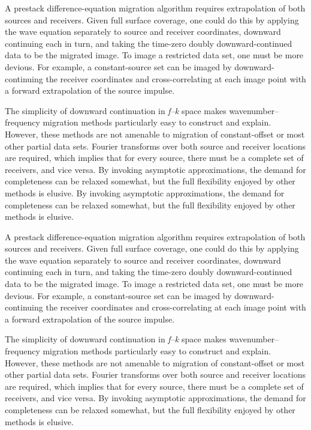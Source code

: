 \begin{examples}
A prestack difference-equation migration algorithm requires extrapolation of both sources and receivers. Given full surface coverage, one could
do this by applying the wave equation separately to source and receiver coordinates, downward continuing each in turn, and taking the time-zero doubly
downward-continued data to be the migrated image. To image a restricted data set, one must be more devious. For example, a constant-source
set can be imaged by downward-continuing the receiver coordinates and cross-correlating at each image point with a forward extrapolation of the source
impulse.
\end{examples}

The simplicity of downward continuation in \textit{f--k} space makes wavenumber--frequency migration methods particularly easy to construct and explain.
However, these methods are not amenable to migration of constant-offset or most other partial data sets. Fourier transforms over both source
and receiver locations are required, which implies that for every source, there must be a complete set of receivers, and vice versa. By invoking
asymptotic approximations, the demand for completeness can be relaxed somewhat, but the full flexibility enjoyed by other methods is elusive. By invoking
asymptotic approximations, the demand for completeness can be relaxed somewhat, but the full flexibility enjoyed by other methods is elusive.

\begin{problems}
A prestack difference-equation migration algorithm requires extrapolation of both sources and receivers. Given full surface coverage, one could
do this by applying the wave equation separately to source and receiver coordinates, downward continuing each in turn, and taking the time-zero doubly
downward-continued data to be the migrated image. To image a restricted data set, one must be more devious. For example, a constant-source
set can be imaged by downward-continuing the receiver coordinates and cross-correlating at each image point with a forward extrapolation of the source
impulse.
\end{problems}

The simplicity of downward continuation in \textit{f--k} space makes wavenumber--frequency migration methods particularly easy to construct and explain.
However, these methods are not amenable to migration of constant-offset or most other partial data sets. Fourier transforms over both source
and receiver locations are required, which implies that for every source, there must be a complete set of receivers, and vice versa. By invoking
asymptotic approximations, the demand for completeness can be relaxed somewhat, but the full flexibility enjoyed by other methods is elusive.

